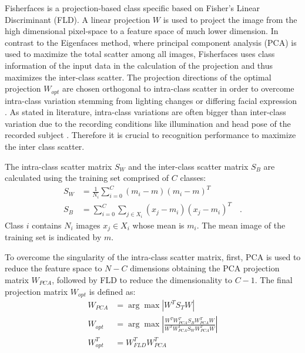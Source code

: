 Fisherfaces is a projection-based class specific based on Fisher's Linear Discriminant (FLD).
A linear projection $W$ is used to project the image from the high dimensional pixel-space to a feature space of much lower dimension.
In contrast to the Eigenfaces method, where principal component analysis (PCA) is used to maximize the total scatter among all images, Fisherfaces uses class information of the input data in the calculation of the projection and thus maximizes the inter-class scatter.
The projection directions of the optimal projection $W_{opt}$ are chosen orthogonal to intra-class scatter in order to overcome intra-class variation stemming from lighting changes or differing facial expression \cite{Belhumeur1997}.
As stated in literature, intra-class variations are often bigger than inter-class variation due to the recording conditions like illumination and head pose of the recorded subject \cite{Adini1997}.
Therefore it is crucial to recognition performance to maximize the inter class scatter.

The intra-class scatter matrix $S_W$ and the inter-class scatter matrix $S_B$ are calculated using the training set comprised of $C$ classes:
\begin{align}
  S_W&=\frac{1}{N_i}\sum\limits_{i=0}^{C}(m_i-m)(m_i-m)^T \\
  S_B&=\sum\limits_{i=0}^{C}\sum\limits_{j \in X_i}(x_j-m_i)(x_j-m_i)^T \quad .
\end{align}
Class $i$ contains $N_i$ images $x_j\in X_i$ whose mean is $m_i$. The mean image of the training set is indicated by $m$. %

To overcome the singularity of the intra-class scatter matrix, first, PCA is used to reduce the feature space to $N-C$ dimensions obtaining the PCA projection matrix $W_{PCA}$, followed by FLD to reduce the dimensionality to $C-1$. 
The final projection matrix $W_{opt}$ is defined as:
\begin{align}
  W_{PCA}&=\arg \max {\left|W^T S_T W \right|}\\
  W_{opt}&=\arg \max \left|\frac{W^T W^T_{PCA} S_B W^T_{PCA} W }{W^T W^T_{PCA} S_W W^T_{PCA} W }\right|  \\
  W_{opt}^T&=W_{FLD}^TW_{PCA}^T
\end{align}

